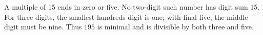A multiple of 15 ends in zero or five. No two-digit such number has digit sum 15. For three digits, the smallest hundreds digit is one; with final five, the middle digit must be nine. Thus $\boxed{195}$ is minimal and is divisible by both three and five.
